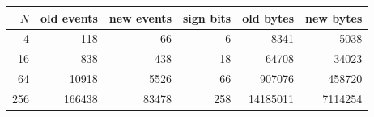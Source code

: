 \begin{center}
\small
\begin{tabular}{rrrrrr}
\toprule
$N$ & old events & new events & sign bits & old bytes & new bytes\\
\midrule
4 & 118 & 66 & 6 & 8341 & 5038\\
16 & 838 & 438 & 18 & 64708 & 34023\\
64 & 10918 & 5526 & 66 & 907076 & 458720\\
256 & 166438 & 83478 & 258 & 14185011 & 7114254\\
\bottomrule
\end{tabular}
\end{center}
